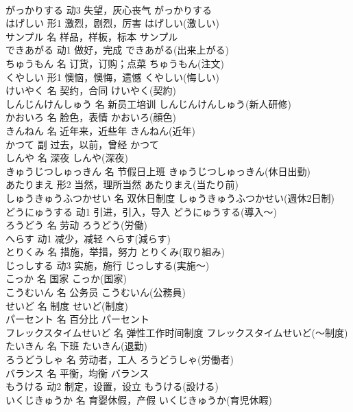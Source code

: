 \documentclass[8pt]{extreport}
\begin{document}
\begin{CJK}{UTF8}{min}
\\	がっかりする	动3	失望，灰心丧气	がっかりする	
\\	はげしい	形1	激烈，剧烈，厉害	はげしい(激しい)	
\\	サンプル	名	样品，样板，标本	サンプル	
\\	できあがる	动1	做好，完成	できあがる(出来上がる)	
\\	ちゅうもん	名	订货，订购；点菜	ちゅうもん(注文)	
\\	くやしい	形1	懊恼，懊悔，遗憾	くやしい(悔しい)	
\\	けいやく	名	契约，合同	けいやく(契約)	
\\	しんじんけんしゅう	名	新员工培训	しんじんけんしゅう(新人研修)	
\\	かおいろ	名	脸色，表情	かおいろ(顔色)	
\\	きんねん	名	近年来，近些年	きんねん(近年)	
\\	かつて	副	过去，以前，曾经	かつて	
\\	しんや	名	深夜	しんや(深夜)	
\\	きゅうじつしゅっきん	名	节假日上班	きゅうじつしゅっきん(休日出勤)	
\\	あたりまえ	形2	当然，理所当然	あたりまえ(当たり前)	
\\	しゅうきゅうふつかせい	名	双休日制度	しゅうきゅうふつかせい(週休2日制)	
\\	どうにゅうする	动1	引进，引入，导入	どうにゅうする(導入～)	
\\	ろうどう	名	劳动	ろうどう(労働)	
\\	へらす	动1	减少，减轻	へらす(減らす)	
\\	とりくみ	名	措施，举措，努力	とりくみ(取り組み)	
\\	じっしする	动3	实施，施行	じっしする(実施～)	
\\	こっか	名	国家	こっか(国家)	
\\	こうむいん	名	公务员	こうむいん(公務員)	
\\	せいど	名	制度	せいど(制度)	
\\	パーセント	名	百分比	パーセント
\\	フレックスタイムせいど	名	弹性工作时间制度	フレックスタイムせいど(～制度)	
\\	たいきん	名	下班	たいきん(退勤)	
\\	ろうどうしゃ	名	劳动者，工人	ろうどうしゃ(労働者)	
\\	バランス	名	平衡，均衡	バランス	
\\	もうける	动2	制定，设置，设立	もうける(設ける)	
\\	いくじきゅうか	名	育婴休假，产假	いくじきゅうか(育児休暇)	

\end{CJK}
\end{document}
